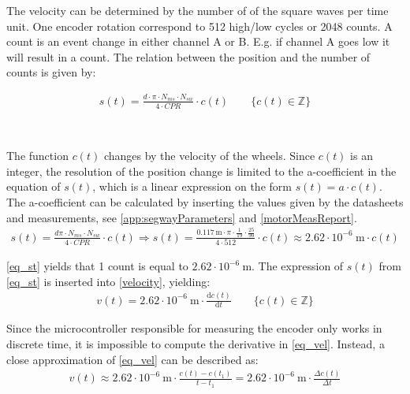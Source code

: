 The velocity can be determined by the number of of the square waves per time unit. One encoder rotation correspond to 512 high/low cycles or 2048 counts. A count is an event change in either channel A or B. E.g. if channel A goes low it will result in a count. The relation between the position and the number of counts is given by:

\begin{align}
s(t) = \frac{d \cdot \pi \cdot N_{ms} \cdot N_{sw}}{4\cdot CPR} \cdot c(t) \qquad \{c(t) \in \mathbb{Z}\}
\end{align}
\begin{where}
\\
\end{where}

The function $c(t)$ changes by the velocity of the wheels. Since $c(t)$ is an integer, the resolution of the position change is limited to the a-coefficient in the equation of $s(t)$, which is a linear expression on the form $s(t) = a \cdot c(t)$. The a-coefficient can be calculated by inserting the values given by the datasheets and measurements, see \autoref{app:segwayParameters} and \autoref{motorMeasReport}.
\begin{align}
s(t) = \frac{d \pi \cdot N_{ms} \cdot N_{sw}}{4\cdot CPR} \cdot c(t) \Rightarrow s(t) = \frac{0.117 \, \text{m} \cdot \pi \cdot  \frac{1}{19} \cdot \frac{25}{90}}{4\cdot 512} \cdot c(t) \approx 2.62 \cdot 10^{-6} \: \text{m} \cdot c(t)
\label{eq_st}
\end{align}

\autoref{eq_st} yields that 1 count is equal to $2.62 \cdot 10^{-6} \: \text{m}$. The expression of $s(t)$ from \autoref{eq_st} is inserted into \autoref{velocity}, yielding:
\begin{align}
v(t) = 2.62 \cdot 10^{-6} \: \text{m} \cdot \frac{\text{d}c(t)}{\text{d}t} \qquad \{c(t) \in \mathbb{Z}\}
\label{eq_vel}
\end{align}

Since the microcontroller responsible for measuring the encoder only works in discrete time, it is impossible to compute the derivative in \autoref{eq_vel}. Instead, a close approximation of \autoref{eq_vel} can be described as:
\begin{align}
v(t) \approx 2.62 \cdot 10^{-6} \: \text{m} \cdot \frac{c(t)-c(t_1)}{t-t_1} = 2.62 \cdot 10^{-6} \: \text{m} \cdot \frac{\Delta c(t)}{\Delta t}
\label{eq_vel2}
\end{align}

